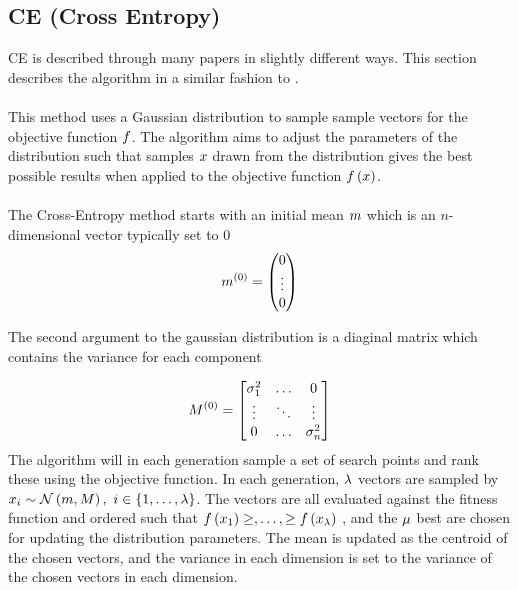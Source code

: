 \subsection{CE (Cross Entropy) \label{CrossEntropy}}
CE is described through many papers in 
slightly different ways. This section
describes the algorithm in a similar fashion 
to \citep{thiery:09}.\\
\\
This method uses a Gaussian distribution to 
sample sample vectors for the objective function
$f$. The algorithm aims to 
adjust the parameters of the distribution
such that samples $x$ drawn from the distribution
gives the best possible results when applied to the
objective function $f \left( x \right)$.\\
\\
The Cross-Entropy method starts with an initial 
mean $m$ which is an $n$-dimensional vector
typically set to 0
\begin{align}
m^{(0)} = \begin{pmatrix}
0\\
\vdots\\
0
\end{pmatrix} 
\end{align}

The second argument to the gaussian distribution is a 
diaginal matrix which contains the variance for each 
component

\begin{align}
M^{(0)} =
\begin{bmatrix}
\sigma_1^{2} & \hdots & 0\\
\vdots & \ddots & \vdots\\
0 & \hdots & \sigma_{n}^{2}
\end{bmatrix}
\end{align}
The algorithm will in each generation sample a set of search points
and rank these using the objective function.
In each generation, $\lambda$ vectors are sampled by 
$x_{i} \sim \mathcal{N} \left(m, M \right)
,\ i \in \{1,\dots,\lambda \}$. The vectors are all evaluated 
against the fitness function and ordered such that $f \left( x_{1} \right) \geq, \dots, \geq f \left( x_{\lambda} \right)$
, and the $\mu$ best are chosen for updating the distribution 
parameters. The mean is updated as the centroid of the chosen vectors, and
the variance in each dimension is set to the variance of the chosen vectors in each 
dimension.\\

